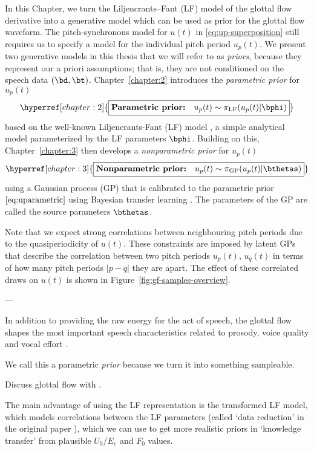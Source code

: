 \begin{chaptersections}{%
In this Chapter, we turn the Liljencrants–Fant (LF) model of the glottal flow derivative into a generative model which can be used as prior for the glottal flow waveform.
}
The pitch-synchronous model for $u(t)$ in \eqref{eq:up-superposition} still requires us to specify a model for the individual pitch period $u_p(t)$.
We present two generative models in this thesis that we will refer to as \emph{priors}, because they represent our a priori assumptions; that is, they are not conditioned on the speech data $(\bd,\bt)$.
Chapter~\ref{chapter:2} introduces the \emph{parametric prior} for $u_p(t)$
\begin{equation}
    \hyperref[chapter:2]{\boxed{\textbf{Parametric prior:} \quad u_p(t) \sim \pi_{\text{LF}}(u_p(t)|\bphi)}}
\end{equation}
based on the well-known Liljencrants-Fant (LF) model \citep{Fant1985}, a simple analytical model parameterized by the LF parameters $\bphi$.
Building on this, Chapter~\ref{chapter:3} then develops a \emph{nonparametric prior} for $u_p(t)$
\begin{equation}
    \hyperref[chapter:3]{\boxed{\textbf{Nonparametric prior:} \quad u_p(t) \sim \pi_{\text{GP}}(u_p(t)|\bthetas)}}
\end{equation}
using a Gaussian process (GP) that is calibrated to the parametric prior $\eqref{eq:uparametric}$ using Bayesian transfer learning \citep{Xuan2021}.
The parameters of the GP are called the source parameters $\bthetas$.

Note that we expect strong correlations between neighbouring pitch periods due to the quasiperiodicity of $u(t)$.
These constraints are imposed by latent GPs that describe the correlation between two pitch periods $u_p(t)$, $u_q(t)$ in terms of how many pitch periods $|p-q|$ they are apart.
The effect of these correlated draws on $u(t)$ is shown in Figure~\ref{fig:gf-samples-overview}.

---


In addition to providing the raw energy for the act of speech, the glottal flow shapes the most important speech characteristics related to prosody, voice quality and vocal effort \citep{Doval2006,Drugman2019a}.

We call this a parametric \emph{prior} because we turn it into something sampleable.

Discuss glottal flow with \citep{Doval2006}.

The main advantage of using the LF representation is the transformed LF model, which models correlations between the LF parameters (called `data reduction' in the original paper \citep{Fant1994}), which we can use to get more realistic priors in `knowledge transfer' from plausible $U_0/E_e$ and $F_0$ values.


\end{chaptersections}
